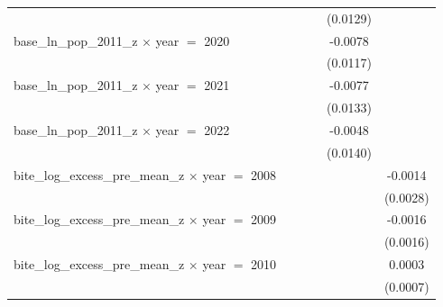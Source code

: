 \begin{tabular}{lccccc}
                                                                &                    &                 &                       & (0.0129)                   &   \\   
   base\_ln\_pop\_2011\_z $\times$ year $=$ 2020                &                    &                 &                       & -0.0078                    &   \\   
                                                                &                    &                 &                       & (0.0117)                   &   \\   
   base\_ln\_pop\_2011\_z $\times$ year $=$ 2021                &                    &                 &                       & -0.0077                    &   \\   
                                                                &                    &                 &                       & (0.0133)                   &   \\   
   base\_ln\_pop\_2011\_z $\times$ year $=$ 2022                &                    &                 &                       & -0.0048                    &   \\   
                                                                &                    &                 &                       & (0.0140)                   &   \\   
   bite\_log\_excess\_pre\_mean\_z $\times$ year $=$ 2008       &                    &                 &                       &                            & -0.0014\\   
                                                                &                    &                 &                       &                            & (0.0028)\\   
   bite\_log\_excess\_pre\_mean\_z $\times$ year $=$ 2009       &                    &                 &                       &                            & -0.0016\\   
                                                                &                    &                 &                       &                            & (0.0016)\\   
   bite\_log\_excess\_pre\_mean\_z $\times$ year $=$ 2010       &                    &                 &                       &                            & 0.0003\\   
                                                                &                    &                 &                       &                            & (0.0007)\\   

\end{tabular}
